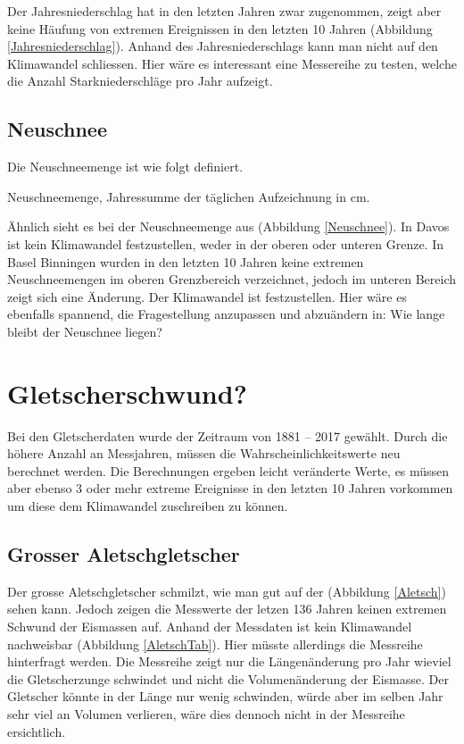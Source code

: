 \begin{refsection}
Der Jahresniederschlag hat in den letzten Jahren zwar zugenommen, zeigt aber keine Häufung von extremen Ereignissen in den letzten 10 Jahren (Abbildung \ref{Jahresniederschlag}). Anhand des Jahresniederschlags kann man nicht auf den Klimawandel schliessen. Hier wäre es interessant eine Messereihe zu testen, welche die Anzahl Starkniederschläge pro Jahr aufzeigt.


\subsection{Neuschnee}
Die Neuschneemenge ist wie folgt definiert.

\begin{definition}
Neuschneemenge, Jahressumme der täglichen Aufzeichnung in cm.
\end{definition}

Ähnlich sieht es bei der Neuschneemenge aus (Abbildung \ref{Neuschnee}). In Davos ist kein Klimawandel festzustellen, weder in der oberen oder unteren Grenze. In Basel Binningen wurden in den letzten 10 Jahren keine extremen Neuschneemengen im oberen Grenzbereich verzeichnet, jedoch im unteren Bereich zeigt sich eine Änderung. Der Klimawandel ist festzustellen.
Hier wäre es ebenfalls spannend, die Fragestellung anzupassen und abzuändern in: Wie lange bleibt der Neuschnee liegen?


\section{Gletscherschwund?}
Bei den Gletscherdaten wurde der Zeitraum von 1881 -- 2017 gewählt. Durch die höhere Anzahl an Messjahren, müssen die Wahrscheinlichkeitswerte neu berechnet werden. Die Berechnungen ergeben leicht veränderte Werte, es müssen aber ebenso 3 oder mehr extreme Ereignisse in den letzten 10 Jahren vorkommen um diese dem Klimawandel zuschreiben zu können.


\subsection{Grosser Aletschgletscher}
Der grosse Aletschgletscher schmilzt, wie man gut auf der (Abbildung \ref{Aletsch}) sehen kann. Jedoch zeigen die Messwerte der letzen 136 Jahren keinen extremen Schwund der Eismassen auf.
%
Anhand der Messdaten ist kein Klimawandel nachweisbar (Abbildung \ref{AletschTab}). Hier müsste allerdings die Messreihe hinterfragt werden. Die Messreihe zeigt nur die Längenänderung pro Jahr wieviel die Gletscherzunge schwindet und nicht die Volumenänderung der Eismasse. Der Gletscher könnte in der Länge nur wenig schwinden, würde aber im selben Jahr sehr viel an Volumen verlieren, wäre dies dennoch nicht in der Messreihe ersichtlich.



\end{refsection}

